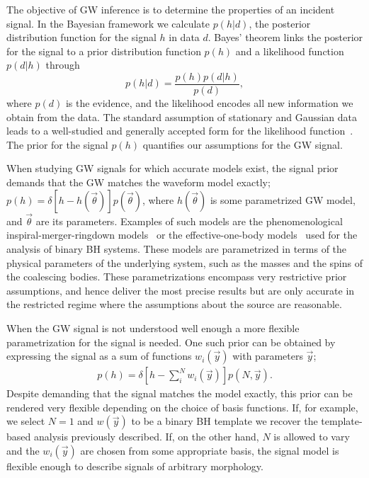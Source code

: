 \documentclass[aps,prd,amsmath,floats,floatfix, twocolumn,
superscriptaddress,nofootinbib,showpacs]{revtex4-1}
\begin{document}
The objective of GW inference is to determine the properties of an incident signal. In the Bayesian framework we calculate $p(h|d)$, the posterior distribution function for the signal $h$ in data $d$. Bayes' theorem links the posterior for the signal to a prior distribution function $p(h)$ and a likelihood function $p(d|h)$ through
%
\begin{equation}
p(h|d)=\frac{p(h)p(d|h)}{p(d)},
\end{equation}
%
where $p(d)$ is the evidence, and the likelihood encodes all new information we obtain from the data. The standard assumption of stationary and Gaussian data leads to a well-studied and generally accepted form for the likelihood function~\cite{Veitch:2014wba}. The prior for the signal $p(h)$ quantifies our assumptions for the GW signal.  

When studying GW signals for which accurate models exist, the signal prior demands that the GW matches the waveform model exactly; $p(h)=\delta[h-h(\vec{\theta})]p(\vec{\theta})$, where $h(\vec{\theta})$ is some parametrized GW model, and $\vec{\theta}$ are its parameters. Examples of such models are the phenomenological inspiral-merger-ringdown models~\cite{Hannam:2013oca} or the effective-one-body models~\cite{Bohe:2016gbl} used for the analysis of binary BH systems. These models are parametrized in terms of the physical parameters of the underlying system, such as the masses and the spins of the coalescing bodies. These parametrizations encompass very restrictive prior assumptions, and hence deliver the most precise results but are only accurate in the restricted regime where the assumptions about the source are reasonable.

When the GW signal is not understood well enough a more flexible parametrization for the signal is needed. One such prior can be obtained by expressing the signal as a sum of functions $w_i(\vec{y})$ with parameters $\vec{y}$; 
%
\begin{align}
p(h)=\delta \left[h-\sum^N_i w_i(\vec{y})\right]p(N,\vec{y}).\label{eq:priors}
\end{align}
%
Despite demanding that the signal matches the model exactly, this prior can be rendered very flexible depending on the choice of basis functions. If, for example, we select $N=1$ and $w(\vec{y})$ to be a binary BH template we recover the template-based analysis previously described. If, on the other hand, $N$ is allowed to vary and the $w_i(\vec{y})$ are chosen from some appropriate basis, the signal model is flexible enough to describe signals of arbitrary morphology.
\end{document}
